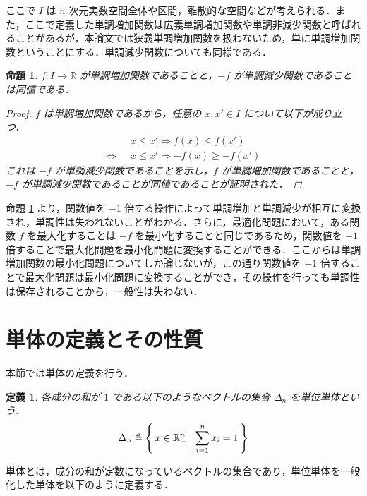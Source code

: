 \documentclass[a4paper,11pt]{jreport}
\newtheorem{definition}{定義}
\newtheorem{proposition}{命題}
\begin{document}
ここで $ I $ は $ n $ 次元実数空間全体や区間，離散的な空間などが考えられる．また，ここで定義した単調増加関数は広義単調増加関数や単調非減少関数と呼ばれることがあるが，本論文では狭義単調増加関数を扱わないため，単に単調増加関数ということにする．単調減少関数についても同様である．

\begin{proposition} \label{prop:keeping_monotonicity}
$ f : I \to \mathbb{R} $ が単調増加関数であることと，$ -f $ が単調減少関数であることは同値である．

\begin{proof}
$ f $ は単調増加関数であるから，任意の $ x, x' \in I $ について以下が成り立つ．
\begin{align*}
& x \leq x' \Rightarrow f(x) \leq f(x') \\
\Longleftrightarrow \hspace{8pt} & x \leq x' \Rightarrow -f(x) \geq -f(x')
\end{align*}
これは $ -f $ が単調減少関数であることを示し，$ f $ が単調増加関数であることと，$ -f $ が単調減少関数であることが同値であることが証明された．
\end{proof}

\end{proposition}

命題 \ref{prop:keeping_monotonicity} より，関数値を $ -1 $ 倍する操作によって単調増加と単調減少が相互に変換され，単調性は失われないことがわかる．さらに，最適化問題において，ある関数 $ f $ を最大化することは $ -f $ を最小化することと同じであるため，関数値を $ -1 $ 倍することで最大化問題を最小化問題に変換することができる．ここからは単調増加関数の最小化問題についてしか論じないが，この通り関数値を $ -1 $ 倍することで最大化問題は最小化問題に変換することができ，その操作を行っても単調性は保存されることから，一般性は失わない．\par

\section{単体の定義とその性質}

本節では単体の定義を行う．

\begin{definition}
各成分の和が $ 1 $ である以下のようなベクトルの集合 $ \Delta_n $ を単位単体という．
$$ \Delta_n \triangleq \Set{ x \in \mathbb{R}^n_{+} | \sum_{i=1}^{n} x_i = 1 } $$
\end{definition}

単体とは，成分の和が定数になっているベクトルの集合であり，単位単体を一般化した単体を以下のように定義する．
\end{document}
